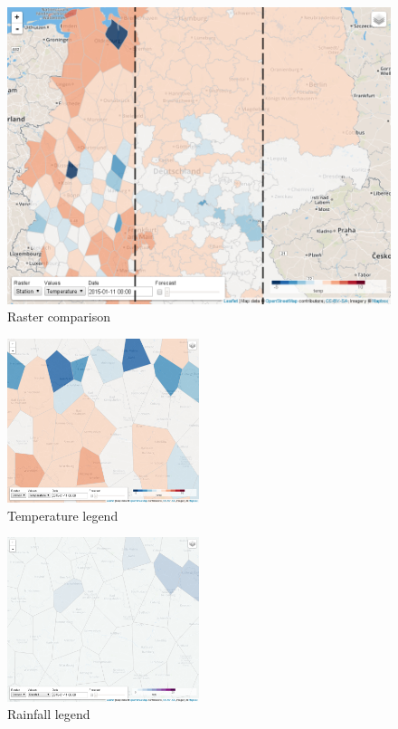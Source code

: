 \documentclass[paper=a4, fontsize=11pt]{article} %
\numberwithin{equation}{section} %
\numberwithin{figure}{section} %
\numberwithin{table}{section} %
\begin{document}
\begin{figure}[htbp]
\centering
\includegraphics[width=1\textwidth]{pictures/screenshot-raster.png}
\caption{Raster comparison}
\label{fig:raster-comparison}
\end{figure}

\begin{figure}[htbp]
\centering
\includegraphics[width=0.5\textwidth]{pictures/screenshot-legend-temp.png}
\caption{Temperature legend}
\label{fig:temperature-legend}
\end{figure}

\begin{figure}[htbp]
\centering
\includegraphics[width=0.5\textwidth]{pictures/screenshot-legend-rain.png}
\caption{Rainfall legend}
\label{fig:rainfall-legend}
\end{figure}
\end{document}
